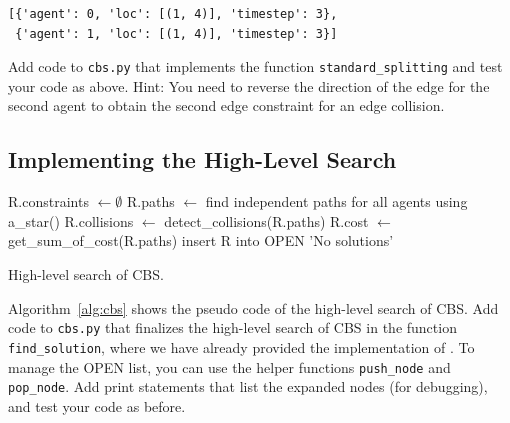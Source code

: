\documentclass[11pt]{article}
\begin{document}
\begin{verbatim}
[{'agent': 0, 'loc': [(1, 4)], 'timestep': 3},
 {'agent': 1, 'loc': [(1, 4)], 'timestep': 3}]
\end{verbatim}

Add code to \texttt{cbs.py} that implements the function \texttt{standard_splitting} and test your code as above. Hint: You need to reverse the direction of the edge for the second agent to obtain the second edge constraint for an edge collision.

\subsection{Implementing the High-Level Search}

\SetInd{0.5em}{0.5em}
\begin{algorithm}
\DontPrintSemicolon
{}
R.constraints $\leftarrow \emptyset$\;\label{alg:cbs:initStart}
R.paths $\leftarrow$ find independent paths for all agents using a\_star()\;
R.collisions $\leftarrow$ detect\_collisions(R.paths)\;
R.cost $\leftarrow$ get\_sum\_of\_cost(R.paths)\;
insert R into OPEN\;\label{alg:cbs:initEnd}
\KwRet 'No solutions'\;
\caption{High-level search of CBS.}
\label{alg:cbs}
\end{algorithm}

Algorithm~\ref{alg:cbs} shows the pseudo code of the high-level search of CBS. Add code to \texttt{cbs.py} that finalizes the high-level search of CBS in the function \texttt{find_solution}, where we have already provided the implementation of .
To manage the OPEN list, you can use the helper functions \texttt{push_node} and \texttt{pop_node}. Add print statements that list the expanded nodes (for debugging), and test your code as before.
\end{document}
